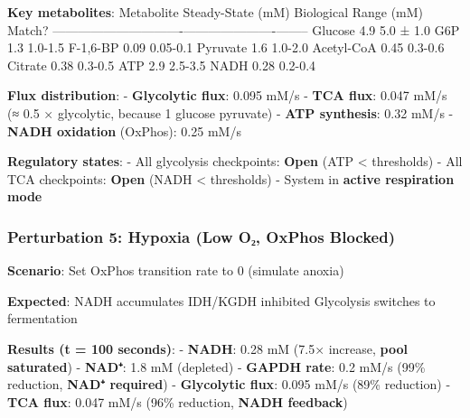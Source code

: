 \textbf{Key metabolites}: \textbar{} Metabolite \textbar{} Steady-State
(mM) \textbar{} Biological Range (mM) \textbar{} Match? \textbar{}
\textbar------------\textbar-------------------\textbar----------------------\textbar--------\textbar{}
\textbar{} Glucose \textbar{} 4.9 \textbar{} 5.0 ± 1.0 \textbar{} \checkmark
\textbar{} \textbar{} G6P \textbar{} 1.3 \textbar{} 1.0-1.5 \textbar{} \checkmark
\textbar{} \textbar{} F-1,6-BP \textbar{} 0.09 \textbar{} 0.05-0.1
\textbar{} \checkmark \textbar{} \textbar{} Pyruvate \textbar{} 1.6 \textbar{}
1.0-2.0 \textbar{} \checkmark \textbar{} \textbar{} Acetyl-CoA \textbar{} 0.45
\textbar{} 0.3-0.6 \textbar{} \checkmark \textbar{} \textbar{} Citrate \textbar{}
0.38 \textbar{} 0.3-0.5 \textbar{} \checkmark \textbar{} \textbar{} ATP
\textbar{} 2.9 \textbar{} 2.5-3.5 \textbar{} \checkmark \textbar{} \textbar{}
NADH \textbar{} 0.28 \textbar{} 0.2-0.4 \textbar{} \checkmark \textbar{}

\textbf{Flux distribution}: - \textbf{Glycolytic flux}: 0.095 mM/s -
\textbf{TCA flux}: 0.047 mM/s (≈ 0.5 × glycolytic, because 1 glucose 
pyruvate) - \textbf{ATP synthesis}: 0.32 mM/s - \textbf{NADH oxidation}
(OxPhos): 0.25 mM/s

\textbf{Regulatory states}: - All glycolysis checkpoints: \textbf{Open}
(ATP \textless{} thresholds) - All TCA checkpoints: \textbf{Open} (NADH
\textless{} thresholds) - System in \textbf{active respiration mode}

\hypertarget{perturbation-5-hypoxia-low-oux2082-oxphos-blocked}{%
\subsubsection{Perturbation 5: Hypoxia (Low O₂, OxPhos
Blocked)}\label{perturbation-5-hypoxia-low-oux2082-oxphos-blocked}}

\textbf{Scenario}: Set OxPhos transition rate to 0 (simulate anoxia)

\textbf{Expected}: NADH accumulates \textrightarrow IDH/KGDH inhibited \textrightarrow Glycolysis
switches to fermentation

\textbf{Results (t = 100 seconds)}: - \textbf{NADH}: 0.28  mM (7.5×
increase, \textbf{pool saturated}) - \textbf{NAD⁺}: 1.8  mM
(depleted) - \textbf{GAPDH rate}: 0.2  mM/s (99\% reduction,
\textbf{NAD⁺ required}) - \textbf{Glycolytic flux}: 0.095  mM/s
(89\% reduction) - \textbf{TCA flux}: 0.047  mM/s (96\%
reduction, \textbf{NADH feedback})

